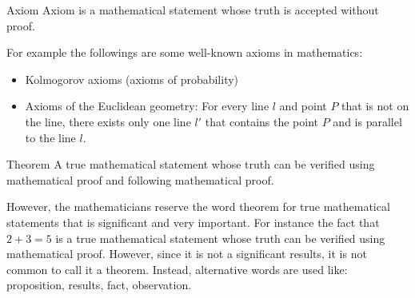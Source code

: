 \begin{defbox}{Axiom}
	Axiom is a mathematical statement whose truth is accepted without proof.
\end{defbox}

For example the followings are some well-known axioms in mathematics:

\begin{itemize}
	\item Kolmogorov axioms (axioms of probability)
	\item Axioms of the Euclidean geometry: For every line $l$ and point $P$ that is not on the line, there exists only one line $l'$ that contains the point $P$ and is parallel to the line $l$.
\end{itemize}

\begin{defbox}{Theorem}
	A true mathematical statement whose truth can be verified using mathematical proof and following mathematical proof.
\end{defbox}

However, the mathematicians reserve the word theorem for true mathematical statements that is significant and very important. For instance the fact that $2 + 3 = 5$ is a true mathematical statement whose truth can be verified using mathematical proof. However, since it is not a significant results, it is not common to call it a theorem. Instead, alternative words are used like: proposition, results, fact, observation.  
